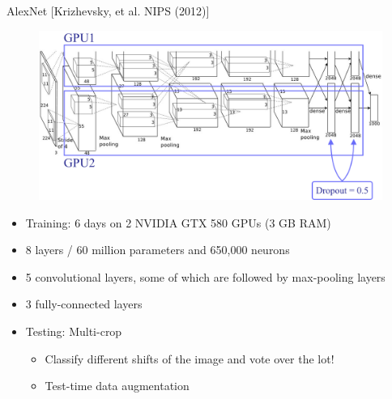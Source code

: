 \documentclass[serif, aspectratio=169]{beamer}
\begin{document}
\begin{frame}{AlexNet [Krizhevsky, et al. NIPS (2012)]}
    \begin{figure}[htpb]
		\begin{center}
			\includegraphics[keepaspectratio, scale=0.2]{pic/alexnet_annot}
		\end{center}
	\end{figure}
	\vspace{-0.2cm}
    \begin{itemize}
   		\setlength{\itemsep}{-1.6pt}
        \item Training: 6 days on 2 NVIDIA GTX 580 GPUs (3 GB RAM)
        \item 8 layers / 60 million parameters and 650,000 neurons
        \item 5 convolutional layers, some of which are followed by max-pooling layers
        \item 3 fully-connected layers
        \item Testing: Multi-crop
        \begin{itemize}
   	   		\setlength{\itemsep}{-1.6pt}
        	\item Classify different shifts of the image and vote over the lot!
        	\item Test-time data augmentation
        \end{itemize}
    \end{itemize}
\end{frame}
\end{document}

